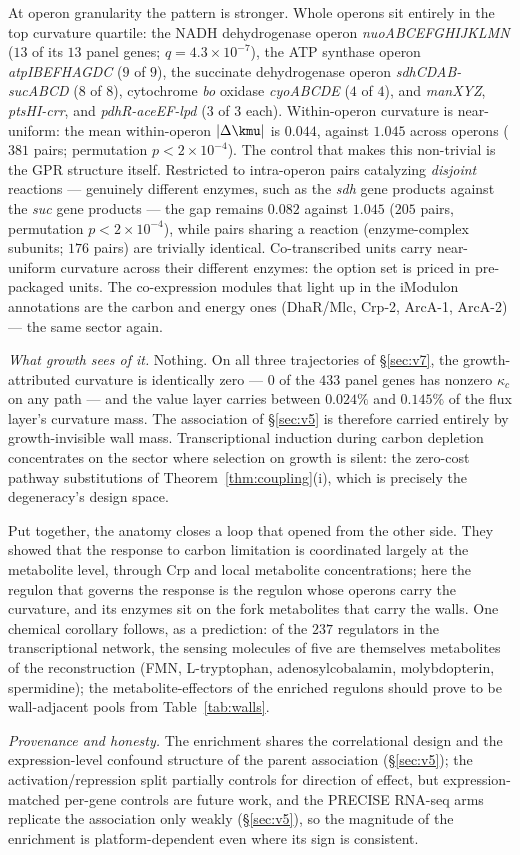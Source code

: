 At operon granularity the pattern is stronger. Whole operons sit
entirely in the top curvature quartile: the NADH dehydrogenase
operon \emph{nuoABCEFGHIJKLMN} ($13$ of its $13$ panel genes; $q =
4.3 \times 10^{-7}$), the ATP synthase operon \emph{atpIBEFHAGDC}
($9$ of $9$), the succinate dehydrogenase operon
\emph{sdhCDAB-sucABCD} ($8$ of $8$), cytochrome \emph{bo}
oxidase \emph{cyoABCDE} ($4$ of $4$), and \emph{manXYZ},
\emph{ptsHI-crr}, and \emph{pdhR-aceEF-lpd} ($3$ of $3$ each).
Within-operon curvature is near-uniform: the mean
within-operon $|\Delta\kmu|$ is $0.044$, against $1.045$ across
operons ($381$ pairs; permutation $p < 2 \times 10^{-4}$). The
control that makes this non-trivial is the GPR structure itself.
Restricted to intra-operon pairs catalyzing \emph{disjoint}
reactions --- genuinely different enzymes, such as the
\emph{sdh} gene products against the \emph{suc} gene products ---
the gap remains $0.082$ against $1.045$ ($205$ pairs,
permutation $p < 2 \times 10^{-4}$), while pairs sharing a
reaction (enzyme-complex subunits; $176$ pairs) are trivially
identical. Co-transcribed units carry near-uniform curvature
across their different enzymes: the option set is priced in
pre-packaged units. The co-expression modules that light up in the
iModulon annotations are the carbon and energy ones (DhaR/Mlc,
Crp-2, ArcA-1, ArcA-2) --- the same sector again.

\emph{What growth sees of it.} Nothing. On all three trajectories
of \S\ref{sec:v7}, the growth-attributed curvature is identically
zero --- $0$ of the $433$ panel genes has nonzero $\kappa_c$ on
any path --- and the value layer carries between $0.024\%$ and
$0.145\%$ of the flux layer's curvature mass. The association of
\S\ref{sec:v5} is therefore carried entirely by growth-invisible
wall mass. Transcriptional induction during carbon depletion
concentrates on the sector where selection on growth is silent:
the zero-cost pathway substitutions of Theorem~\ref{thm:coupling}(i),
which is precisely the degeneracy's design space.

Put together, the anatomy closes a loop that
\citet{kochanowski2013} opened from the other side. They showed
that the response to carbon limitation is coordinated largely at
the metabolite level, through Crp and local metabolite
concentrations; here the regulon that governs the response is the
regulon whose operons carry the curvature, and its enzymes sit on
the fork metabolites that carry the walls. One chemical corollary
follows, as a prediction: of the $237$ regulators in the
transcriptional network, the sensing molecules of five are
themselves metabolites of the reconstruction (FMN, L-tryptophan,
adenosylcobalamin, molybdopterin, spermidine); the
metabolite-effectors of the enriched regulons should prove to be
wall-adjacent pools from Table~\ref{tab:walls}.

\emph{Provenance and honesty.} The enrichment shares the
correlational design and the expression-level confound structure
of the parent association (\S\ref{sec:v5}); the
activation/repression split partially controls for direction of
effect, but expression-matched per-gene controls are future work,
and the PRECISE RNA-seq arms replicate the association only weakly
(\S\ref{sec:v5}), so the magnitude of the enrichment is
platform-dependent even where its sign is consistent.

